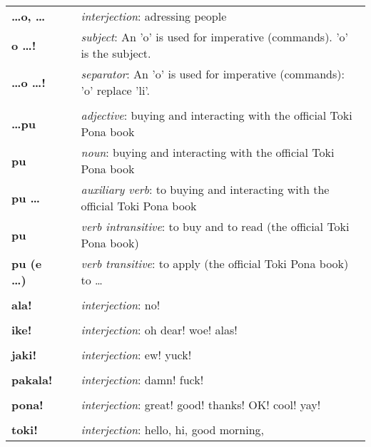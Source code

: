 \begin{supertabular}{p{2,5cm}|ll}
\textbf{\dots o, \dots} && \textit{interjection}: adressing people \\ %
\textbf{o \dots !} && \textit{subject}: An 'o' is used for imperative (commands). 'o' is the subject.  \\ %
\textbf{\dots o \dots !} && \textit{separator}: An 'o' is used for imperative (commands): 'o' replace 'li'. \\ %
 && \\ %
%
\textbf{\dots pu} && \textit{adjective}: buying and interacting with the official Toki Pona book \\ 
\textbf{pu} && \textit{noun}: buying and interacting with the official Toki Pona book \\ 
\textbf{pu \dots} && \textit{auxiliary verb}: to buying and interacting with the official Toki Pona book \\ 
\textbf{pu} && \textit{verb intransitive}:  to buy and to read (the official Toki Pona book) \\
\textbf{pu (e \dots)} && \textit{verb transitive}: to apply (the official Toki Pona book) to \dots \\
 && \\ %
%
\textbf{ala!} && \textit{interjection}: no! \\ %
 && \\ %
%
\textbf{ike!} && \textit{interjection}: oh dear! woe! alas! \\ %
 && \\ %
%
\textbf{jaki!} && \textit{interjection}: ew! yuck! \\ %
 && \\ %
%
\textbf{pakala!} && \textit{interjection}: damn! fuck! \\ %
 && \\ %
%
\textbf{pona!} && \textit{interjection}: great! good! thanks! OK! cool! yay! \\ %
 && \\ %
%
\textbf{toki!} && \textit{interjection}: hello, hi, good morning, \\ %
\end{supertabular} \\
%
%
\newpage
%

